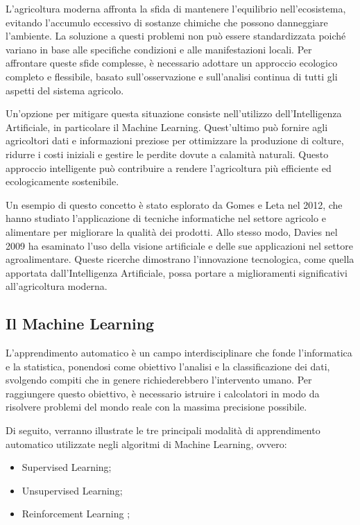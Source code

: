 L'agricoltura moderna affronta la sfida di mantenere l'equilibrio nell'ecosistema, evitando l'accumulo eccessivo di sostanze chimiche che possono danneggiare l'ambiente. La soluzione a questi problemi non può essere standardizzata poiché variano in base alle specifiche condizioni e alle manifestazioni locali. Per affrontare queste sfide complesse, è necessario adottare un approccio ecologico completo e flessibile, basato sull'osservazione e sull'analisi continua di tutti gli aspetti del sistema agricolo.

Un'opzione per mitigare questa situazione consiste nell'utilizzo dell'Intelligenza Artificiale, in particolare il Machine Learning. Quest'ultimo può fornire agli agricoltori dati e informazioni preziose per ottimizzare la produzione di colture, ridurre i costi iniziali e gestire le perdite dovute a calamità naturali. Questo approccio intelligente può contribuire a rendere l'agricoltura più efficiente ed ecologicamente sostenibile.

Un esempio di questo concetto è stato esplorato da Gomes e Leta nel 2012, che hanno studiato l'applicazione di tecniche informatiche nel settore agricolo e alimentare per migliorare la qualità dei prodotti. Allo stesso modo, Davies nel 2009 ha esaminato l'uso della visione artificiale e delle sue applicazioni nel settore agroalimentare. Queste ricerche dimostrano l'innovazione tecnologica, come quella apportata dall'Intelligenza Artificiale, possa portare a miglioramenti significativi all'agricoltura moderna.

\subsection{Il Machine Learning}

L'apprendimento automatico è un campo interdisciplinare che fonde l'informatica e la statistica, ponendosi come obiettivo l'analisi e la classificazione dei dati, svolgendo compiti che in genere richiederebbero l'intervento umano. Per raggiungere questo obiettivo, è necessario istruire i calcolatori in modo da risolvere problemi del mondo reale con la massima precisione possibile.

Di seguito, verranno illustrate le tre principali modalità di apprendimento automatico utilizzate negli algoritmi di Machine Learning, ovvero:

\begin{itemize}
    \item Supervised Learning;
    \item Unsupervised Learning;
    \item Reinforcement Learning ;
\end{itemize}

